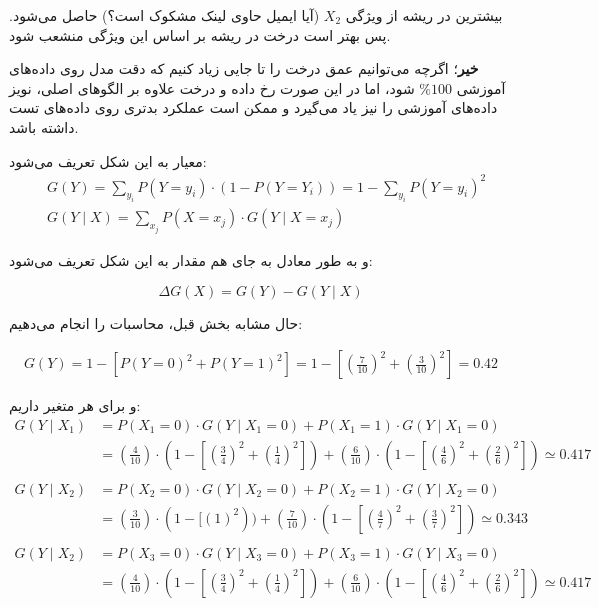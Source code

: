 \begin{ابجد}
بیشترین  در ریشه از ویژگی $X_2$ (آیا ایمیل حاوی لینک مشکوک است؟) حاصل می‌شود. پس بهتر است درخت در ریشه بر اساس این ویژگی منشعب شود.

\item \textbf{خیر}؛ اگرچه می‌توانیم عمق درخت را تا جایی زیاد کنیم که دقت مدل روی داده‌های آموزشی $\% 100$ شود، اما در این صورت  رخ داده و درخت علاوه بر الگوهای اصلی، نویز داده‌های آموزشی را نیز یاد می‌گیرد و ممکن است عملکرد بدتری روی داده‌های تست داشته باشد.

\item معیار  به این شکل تعریف می‌شود:
\begin{align*}
     & G(Y) = \sum_{y_i} P(Y = y_i) \cdot (1 - P(Y = Y_i)) = 1 - \sum_{y_i} P(Y = y_i)^2 \\
     & G(Y \mid X) = \sum_{x_j}P(X = x_j) \cdot G(Y \mid X = x_j)
\end{align*}

و به طور معادل به جای  هم مقدار  به این شکل تعریف می‌شود:

\begin{equation*}
    \Delta G(X) = G(Y) - G(Y \mid X)
\end{equation*}

حال مشابه بخش قبل، محاسبات را انجام می‌دهیم:

\begin{align*}
    G(Y) = 1 - [P(Y = 0)^2 + P(Y = 1)^2] = 1 - [(\frac{7}{10})^2 + (\frac{3}{10})^2] = 0.42
\end{align*}

و برای هر متغیر داریم:
\begin{align*}
    G(Y \mid X_1) & = P(X_1 = 0) \cdot G(Y \mid X_1 = 0) + P(X_1 = 1) \cdot G(Y \mid X_1 = 0)                                                                  \\
                  & = (\frac{4}{10})\cdot(1 - [(\frac{3}{4})^2 + (\frac{1}{4})^2]) + (\frac{6}{10})\cdot(1 - [(\frac{4}{6})^2 + (\frac{2}{6})^2]) \simeq 0.417 \\
    \\
    G(Y \mid X_2) & = P(X_2 = 0) \cdot G(Y \mid X_2 = 0) + P(X_2 = 1) \cdot G(Y \mid X_2 = 0)                                                                  \\
                  & = (\frac{3}{10})\cdot(1 - [(1)^2)) + (\frac{7}{10})\cdot(1 - [(\frac{4}{7})^2 + (\frac{3}{7})^2]) \simeq 0.343                             \\
    \\
    G(Y \mid X_2) & = P(X_3 = 0) \cdot G(Y \mid X_3 = 0) + P(X_3 = 1) \cdot G(Y \mid X_3 = 0)                                                                  \\
                  & = (\frac{4}{10})\cdot(1 - [(\frac{3}{4})^2 + (\frac{1}{4})^2]) + (\frac{6}{10})\cdot(1 - [(\frac{4}{6})^2 + (\frac{2}{6})^2]) \simeq 0.417
\end{align*}


\end{ابجد}
